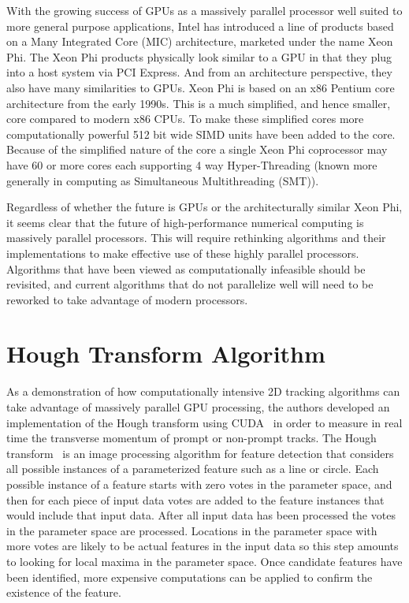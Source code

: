 \documentclass[preprint,sort&compress]{elsarticle}
\begin{document}
With the growing success of GPUs as a massively parallel processor well suited to more general purpose applications, Intel has introduced a line of products based on a Many Integrated Core (MIC) architecture, marketed under the name Xeon Phi.  The Xeon Phi products physically look similar to a GPU in that they plug into a host system via PCI Express.  And from an architecture perspective, they also have many similarities to GPUs.  Xeon Phi is based on an x86 Pentium core architecture from the early 1990s.  This is a much simplified, and hence smaller, core compared to modern x86 CPUs.  To make these simplified cores more computationally powerful 512 bit wide SIMD units have been added to the core.  Because of the simplified nature of the core a single Xeon Phi coprocessor may have 60 or more cores each supporting 4 way Hyper-Threading (known more generally in computing as Simultaneous Multithreading (SMT)).

Regardless of whether the future is GPUs or the architecturally similar Xeon Phi, it seems clear that the future of high-performance numerical computing is massively parallel processors.  This will require rethinking algorithms and their implementations to make effective use of these highly parallel processors.  Algorithms that have been viewed as computationally infeasible should be revisited, and current algorithms that do not parallelize well will need to be reworked to take advantage of modern processors.

\section{Hough Transform Algorithm}

As a demonstration of how computationally intensive 2D tracking algorithms can take advantage of massively parallel GPU processing, the authors developed an implementation of the Hough transform using CUDA~\cite{Halyo:2013} in order to measure in real time the transverse momentum of prompt or non-prompt tracks.  The Hough transform~\cite{bib:HT1,bib:HT2,bib:HT3} is an image processing algorithm for feature detection that considers all possible instances of a parameterized feature such as a line or circle.  Each possible instance of a feature starts with zero votes in the parameter space, and then for each piece of input data votes are added to the feature instances that would include that input data.  After all input data has been processed the votes in the parameter space are processed.  Locations in the parameter space with more votes are likely to be actual features in the input data so this step amounts to looking for local maxima in the parameter space.  Once candidate features have been identified, more expensive computations can be applied to confirm the existence of the feature.
\end{document}
